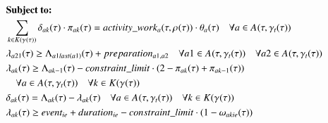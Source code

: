 {\begin{alignat}{2}
		& \textbf{Subject to:}                                                                                                                                                                             \notag\\
	    & \sum_{\ElementWorkSegment \in \SetWorkSegment} \VarProcessingTime \cdot \VarActiveSegment{\ElementActivity}{\ElementWorkSegment} = \ParActivityWork{} \cdot \VarIncludeActivity{\ElementActivity}                                                                                                                                            \quad \forall \ElementActivity \in \SetActivity{\VarSupervisorAssignment{}{\ElementTechnician}}{}                                                                                                      \\
		& \VarStartOfSegment{\ElementActivity2}{1} \geq \VarFinishOfSegment{\ElementActivity1}{last(\ElementActivity1)} + \ParPreparation                                                                    \quad \forall \ElementActivity1 \in \SetActivity{\VarSupervisorAssignment{}{\ElementTechnician}}{} \quad \forall \ElementActivity2 \in \SetActivity{\VarSupervisorAssignment{}{\ElementTechnician}}{}  \\
		& \VarStartOfSegment{\ElementActivity}{\ElementWorkSegment} \geq \VarFinishOfSegment{\ElementActivity}{\ElementWorkSegment-1} - \ParConstraintLimit \cdot (2 - \VarActiveSegment{\ElementActivity}{\ElementWorkSegment} + \VarActiveSegment{\ElementActivity}{\ElementWorkSegment-1})                                                                      \notag\\
		& \quad \forall \ElementActivity \in \SetActivity{\VarSupervisorAssignment{}{\ElementTechnician}}{} \quad\forall \ElementWorkSegment \in \SetWorkSegment                                                 \\ 
		& \VarProcessingTime = \VarFinishOfSegment{\ElementActivity}{\ElementWorkSegment} - \VarStartOfSegment{\ElementActivity}{\ElementWorkSegment}                                                                                                                                              \quad \forall \ElementActivity \in \SetActivity{\VarSupervisorAssignment{}{\ElementTechnician}}{}  \quad\forall \ElementWorkSegment \in \SetWorkSegment                                                \\
		& \VarStartOfSegment{\ElementActivity}{\ElementWorkSegment} \geq \ParEvent + \ParEventDuration - \ParConstraintLimit \cdot (1 - \VarSegmentInRelation) \notag\\ 

\end{alignat}}
